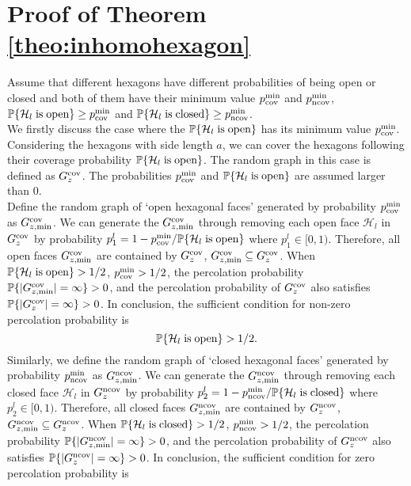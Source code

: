 \documentclass[final]{IEEEtran}
\begin{document}
\section{Proof of Theorem \ref{theo:inhomohexagon}}\label{app:inhomohexagon}
\indent Assume that different hexagons have different probabilities of being open or closed and both of them have their minimum value $p_{\rm cov}^{\min}$ and $p_{\rm ncov}^{\min}$, \ie $\P\{\mathcal{H}_{l} {\rm \; is\;open}\} \geq p_{\rm cov}^{\min}$ and $\P\{\mathcal{H}_{l} {\rm \; is\;closed}\} \geq p_{\rm ncov}^{\min}$.\\ %
\indent We firstly discuss the case where the $\P\{\mathcal{H}_{l} {\rm \; is\;open}\}$ has its minimum value $p_{\rm cov}^{\min}$. Considering the hexagons with side length $a$, we can cover the hexagons following their coverage probability $\P\{\mathcal{H}_{l} {\rm \; is\;open}\}$. The random graph in this case is defined as $G_{z}^{\rm cov}$. The probabilities $p_{\rm cov}^{\min}$ and $\P\{\mathcal{H}_{l} {\rm \; is\;open}\}$ are assumed larger than 0. \\
\indent Define the random graph of `open hexagonal faces' generated by probability $p_{\rm cov}^{\min}$ as $G_{z,\min}^{\rm cov}$. We can generate the $G_{z,\min}^{\rm cov}$ through removing each open face $\mathcal{H}_{l}$ in $G_{z}^{\rm cov}$ by probability $p_{1}^l=1-p_{\rm cov}^{\min}/\P\{\mathcal{H}_{l} {\rm \; is\;open}\}$ where $p_{1}^l\in [0,1)$. Therefore, all open faces $G_{z,\min}^{\rm cov}$ are contained by $G_{z}^{\rm cov}$, \ie $G_{z,\min}^{\rm cov}\subseteq G_{z}^{\rm cov}$. When $\P\{\mathcal{H}_{l} {\rm \; is\;open}\}>1/2$, $p_{\rm cov}^{\min}>1/2$, the percolation probability $\P\{|G_{z,\min}^{\rm cov}|=\infty\}>0$, and the percolation probability of $G_z^{\rm cov}$ also satisfies $\P\{|G_{z}^{\rm cov}|=\infty\}>0$. In conclusion, the sufficient condition for non-zero percolation probability is 
\begin{equation}
    \P\{\mathcal{H}_{l} {\rm \; is\;open}\}>1/2.
\end{equation}
\indent Similarly, we define the random graph of `closed hexagonal faces' generated by probability $p_{\rm ncov}^{\min}$ as $G_{z,\min}^{\rm ncov}$. We can generate the $G_{z,\min}^{\rm ncov}$ through removing each closed face $\mathcal{H}_{l}$ in $G_{z}^{\rm ncov}$ by probability $p_{2}^l=1-p_{\rm ncov}^{\min}/\P\{\mathcal{H}_{l} {\rm \; is\;closed}\}$ where $p_{2}^l\in [0,1)$. Therefore, all closed faces $G_{z,\min}^{\rm ncov}$ are contained by $G_{z}^{\rm ncov}$, \ie $G_{z,\min}^{\rm ncov}\subseteq G_{z}^{\rm ncov}$. When $\P\{\mathcal{H}_{l} {\rm \; is\;closed}\}>1/2$, $p_{\rm ncov}^{\min}>1/2$, the percolation probability $\P\{|G_{z,\min}^{\rm ncov}|=\infty\}>0$, and the percolation probability of $G_z^{\rm ncov}$ also satisfies $\P\{|G_{z}^{\rm ncov}|=\infty\}>0$. In conclusion, the sufficient condition for zero percolation probability is 
\end{document}
